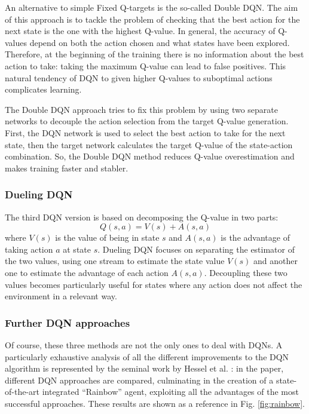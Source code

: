 \documentclass[a4paper, 12pt]{article}
\numberwithin{equation}{section}
\begin{document}
An alternative to simple Fixed Q-targets is the so-called Double DQN. The aim of this approach is to tackle the problem of checking that the best action for the next state is the one with the highest Q-value. In general, the accuracy of Q-values depend on both the action chosen and what states have been explored. Therefore, at the beginning of the training there is no information about the best action to take: taking the maximum Q-value can lead to false positives. This natural tendency of DQN to given higher Q-values to suboptimal actions complicates learning.

The Double DQN approach tries to fix this problem by using two separate networks to decouple the action selection from the target Q-value generation. First, the DQN network is used to select the best action to take for the next state, then the target network calculates the target Q-value of the state-action combination. So, the Double DQN method reduces Q-value overestimation and makes training faster and stabler.

\subsubsection{Dueling DQN}

The third DQN version is based on decomposing the Q-value in two parts:
\begin{equation}
	Q\left(s,a\right)=V\left(s\right)+A\left(s,a\right)
\end{equation}
where $V\left(s\right)$ is the value of being in state $s$ and $A\left(s,a\right)$ is the advantage of taking action $a$ at state $s$. Dueling DQN focuses on separating the estimator of the two values, using one stream to estimate the state value $V\left(s\right)$ and another one to estimate the advantage of each action $A\left(s,a\right)$. Decoupling these two values becomes particularly useful for states where any action does not affect the environment in a relevant way.

\subsubsection{Further DQN approaches}

Of course, these three methods are not the only ones to deal with DQNs. A particularly exhaustive analysis of all the different improvements to the DQN algorithm is represented by the seminal work by Hessel et al. \cite{rainbow}: in the paper, different DQN approaches are compared, culminating in the creation of a state-of-the-art integrated ``Rainbow'' agent, exploiting all the advantages of the most successful approaches. These results are shown as a reference in Fig. \ref{fig:rainbow}.
\end{document}
